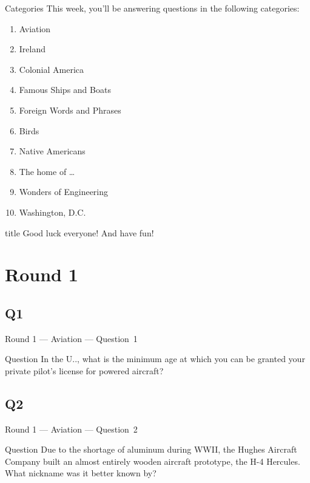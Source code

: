 \documentclass[11pt]{beamer}
\begin{document}
\begingroup{}
\begin{frame}[t]{Categories}
    This week, you'll be answering questions in the following categories:
    \begin{enumerate}
        \item Aviation
        \item Ireland
        \item Colonial America
        \item Famous Ships and Boats
        \item Foreign Words and Phrases
        \item Birds
        \item Native Americans
        \item The home of \ldots{}
        \item Wonders of Engineering
        \item Washington, D.C.
    \end{enumerate}
\end{frame}
\endgroup{}

\begingroup{}
\begin{frame}
    \vfill{}
    \begin{beamercolorbox}[sep=8pt,center,shadow=true,rounded=true]{title}
        Good luck everyone! And have fun!
    \end{beamercolorbox}
    \vfill{}
\end{frame}
\endgroup{}
\def\thisSectionName{Aviation}
\section{Round 1}
\subsection*{Q1}
\begin{frame}[t]{Round 1 --- Aviation --- \mbox{Question 1}}
    \vspace{-0.5em}
    \begin{block}{Question}
        In the U.\@S.\@, what is the minimum age at which you can be granted your private pilot's license for powered aircraft?
    \end{block}
\end{frame}
\subsection*{Q2}
\begin{frame}[t]{Round 1 --- Aviation --- \mbox{Question 2}}
    \vspace{-0.5em}
    \begin{block}{Question}
        Due to the shortage of aluminum during WWII, the Hughes Aircraft Company built an almost entirely wooden aircraft prototype, the H-4 Hercules. What nickname was it better known by?
    \end{block}
\end{frame}
\end{document}
